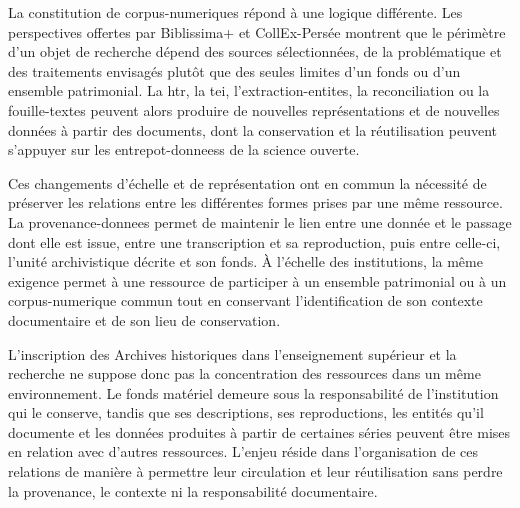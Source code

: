 La constitution de \glspl{corpus-numerique} répond à une logique différente. Les perspectives offertes par Biblissima+ et CollEx-Persée montrent que le périmètre d'un objet de recherche dépend des sources sélectionnées, de la problématique et des traitements envisagés plutôt que des seules limites d'un fonds ou d'un ensemble patrimonial. La \gls{htr}, la \gls{tei}, l'\gls{extraction-entites}, la \gls{reconciliation} ou la \gls{fouille-textes} peuvent alors produire de nouvelles représentations et de nouvelles données à partir des documents, dont la conservation et la réutilisation peuvent s'appuyer sur les \glspl{entrepot-donnees} de la science ouverte.

Ces changements d'échelle et de représentation ont en commun la nécessité de préserver les relations entre les différentes formes prises par une même ressource. La \gls{provenance-donnees} permet de maintenir le lien entre une donnée et le passage dont elle est issue, entre une transcription et sa reproduction, puis entre celle-ci, l'unité archivistique décrite et son fonds. À l'échelle des institutions, la même exigence permet à une ressource de participer à un ensemble patrimonial ou à un \gls{corpus-numerique} commun tout en conservant l'identification de son contexte documentaire et de son lieu de conservation.

L'inscription des Archives historiques dans l'enseignement supérieur et la recherche ne suppose donc pas la concentration des ressources dans un même environnement. Le fonds matériel demeure sous la responsabilité de l'institution qui le conserve, tandis que ses descriptions, ses reproductions, les entités qu'il documente et les données produites à partir de certaines séries peuvent être mises en relation avec d'autres ressources. L'enjeu réside dans l'organisation de ces relations de manière à permettre leur circulation et leur réutilisation sans perdre la provenance, le contexte ni la responsabilité documentaire.